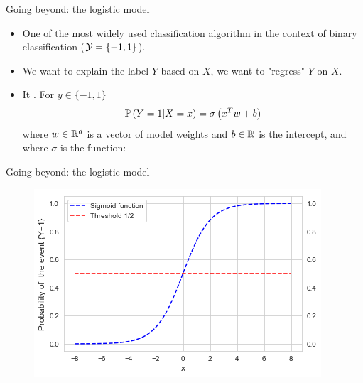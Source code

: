 \documentclass[xcolor={usenames,dvipsnames},handout]{beamer}
\begin{document}
\begin{frame}{Going beyond: the logistic model}

\begin{itemize}
\item One of the most widely used classification algorithm in the context of binary classification 
($\Yc = \{-1, 1\}$).

\item We want to explain the label $Y$ based on $X$, we want to
"regress" $Y$ on $X$.

\item It .
For $y\in \{-1, 1\}$
$$
\P\left(  Y = 1 | X =x \right) = \sigma \left( x^T w +b \right)
$$
where $w\in \R^d$ is a vector of model weights and $b\in\R$ is the
intercept, and where $\sigma$ is the  function:
\end{itemize}
\end{frame}

\begin{frame}{Going beyond: the logistic model}
\begin{figure}[H]
\begin{center}
\includegraphics[scale = .6]{./sigmoid}
\end{center}
\end{figure}
\end{frame}
\end{document}

